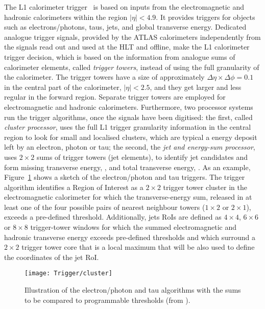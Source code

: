 			The L1 calorimeter trigger~\cite{ATLASJINST, ATLASL1CaloTrig} is based on inputs from the electromagnetic and hadronic calorimeters within the region $\left | \eta \right |<4.9$. It provides triggers for objects such as electrons/photons, taus, jets, and global transverse energy. Dedicated analogue trigger signals, provided by the ATLAS calorimeters independently from the signals read out and used at the HLT and offline, make the L1 calorimeter trigger decision, which is based on the information from analogue sums of calorimeter elements, called \emph{trigger towers}, instead of using the full granularity of the calorimeter. The trigger towers have a size of approximately $\Delta \eta \times \Delta \phi = 0.1$ in the central part of the calorimeter, $\left | \eta \right | < 2.5$, and they get larger and less regular in the forward region. Separate trigger towers are employed for electromagnetic and hadronic calorimeters. Furthermore, two processor systems run the trigger algorithms, once the signals have been digitised: the first, called \emph{cluster processor}, uses the full L1 trigger granularity information in the central region to look for small and localised clusters, which are typical a energy deposit left by an electron, photon or tau; the second, the \emph{jet and energy-sum processor}, uses $2 \times 2$ sums of trigger towers (jet elements), to identify jet candidates and form missing transverse energy, \met, and total transverse energy, \et. As an example, Figure~\ref{fig:calo_cluster} shows a sketch of the electron/photon and tau triggers. The trigger algorithm identifies a Region of Interest as a $2 \times 2$ trigger tower cluster in the electromagnetic calorimeter for which the transverse-energy sum, released in at least one of the four possible pairs of nearest neighbour towers ($1 \times 2$ or $2 \times 1$), exceeds a pre-defined threshold. Additionally, jets RoIs are defined as $4 \times 4$, $6 \times 6$ or $8 \times 8$ trigger-tower windows for which the summed electromagnetic and hadronic transverse energy exceeds pre-defined thresholds and which surround a $2 \times 2$ trigger tower core that is a local maximum that will be also used to define the coordinates of the jet RoI.

			\begin{figure}[!htb]
				\centering
				\texttt{[image: Trigger/cluster]}
				\caption{\label{fig:calo_cluster} Illustration of the electron/photon and tau algorithms with the sums to be compared to programmable thresholds (from \cite{ATLASTrigger2010}).}
			\end{figure}


